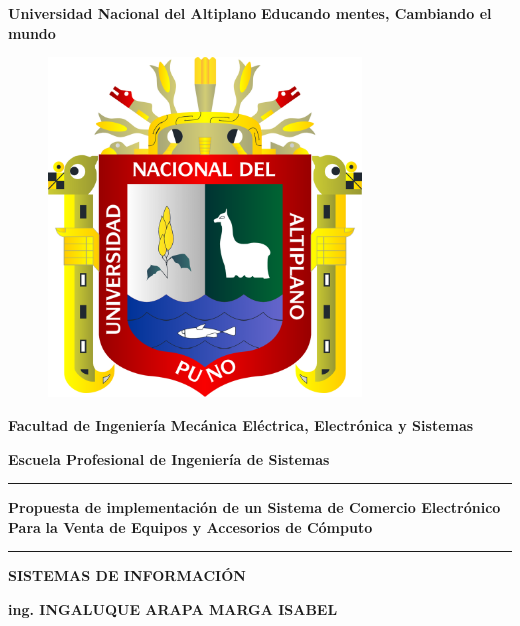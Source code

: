 \begin{titlepage}    
\begin{center}
        {\huge{\textbf{Universidad Nacional del Altiplano}}}
        \vspace{4mm} %
        {\large{\textbf{Educando mentes, Cambiando el mundo}}}
        \vspace{5mm} %
        \begin{figure}[h] %
            \centering
            \includegraphics[height=9cm]{images/Logo_UNAP.png}
        \end{figure}
        \par\vspace{3mm} %
        {\large{\textbf{Facultad de Ingeniería Mecánica Eléctrica,
        Electrónica y Sistemas}}} \par	
        {\large{\textbf{Escuela Profesional de Ingeniería de Sistemas}}}
        \vspace{3mm}
        \textcolor{azul}{\rule{\linewidth}{0.50mm}}
        {\LARGE {\textbf{ Propuesta de implementación de un Sistema de Comercio Electrónico Para}}} %
        \vspace{1mm}
        {\LARGE {\textbf{ la Venta de Equipos y Accesorios de Cómputo }}} %
        \vspace{3mm}
        \textcolor{azul}{\rule{\linewidth}{0.50mm}}
        {\large{\textbf{SISTEMAS DE INFORMACIÓN}}}
        \par\vspace{2mm} %
        {\large{\textbf{\textcolor{azul}{ing. INGALUQUE ARAPA MARGA ISABEL}}}}
        \par\vspace{2mm} %


\end{center}
\end{titlepage}
